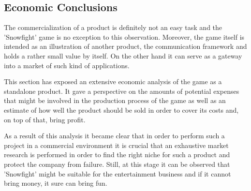 \newpage

\subsection{Economic Conclusions}

The commercialization of a product is definitely not an easy task and the
'Snowfight' game is no exception to this observation. Moreover, the game
itself is intended as an illustration of another product, the communication
framework and holds a rather small value by itself. On the other hand it can
serve as a gateway into a market of such kind of applications.

This section has exposed an extensive economic analysis of the game as a
standalone product. It gave a perspective on the amounts of potential expenses
that might be involved in the production process of the game as well as an
estimate of how well the product should be sold in order to cover its costs
and, on top of that, bring profit.

As a result of this analysis it became clear that in order to perform such a
project in a commercial environment it is crucial that an exhaustive market
research is performed in order to find the right niche for such a product and
protect the company from failure. Still, at this stage it can be observed that
'Snowfight' might be suitable for the entertainment business and if it cannot
bring money, it sure can bring fun.

\clearpage
